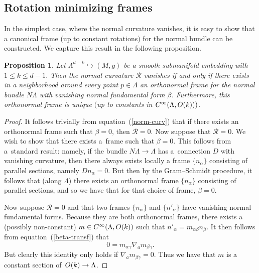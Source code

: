 \documentclass[10pt,a4paper]{article}
\numberwithin{equation}{section}
\newtheorem{Proposition}[Theorem]{Proposition}
 { \theoremstyle{definition}
\newtheorem{Definition}[Theorem]{Definition}
\newtheorem{Note}[Theorem]{Note}
\newtheorem{Problem}[Theorem]{Problem}
\newtheorem{Example}[Theorem]{Example}
\newtheorem{Remark}[Theorem]{Remark} }
\renewcommand{\=}{\stackrel \Lambda =}
\begin{document}
\subsection{Rotation minimizing frames}

In the simplest case, where the normal curvature vanishes, it is easy to show that a canonical frame (up to constant rotations) for the normal bundle can be constructed. We capture this result in the following proposition.
\begin{Proposition} \label{riem-canonical-frame}
Let $\Lambda^{d-k} \hookrightarrow (M,g)$ be a smooth submanifold embedding with $1 \leq k \leq d-1$. Then the normal curvature $\mathcal{R}$ vanishes if and only if there exists in a neighborhood around every point $p \in \Lambda$ an orthonormal frame for the normal bundle $N \Lambda$ with vanishing normal fundamental form $\beta$. Furthermore, this orthonormal frame is unique $($up to constants in $C^\infty(\Lambda,{\rm O}(k)))$.
\end{Proposition}
\begin{proof}
It follows trivially from equation~(\ref{norm-curv}) that if there exists an orthonormal frame such that $\beta = 0$, then $\mathcal{R} = 0$. Now suppose that $\mathcal{R} = 0$. We wish to show that there exists a~frame such that $\beta = 0$. This follows from a~standard result: namely, if the bundle $N \Lambda \rightarrow \Lambda$ has a~connection $D$ with vanishing curvature, then there always exists locally a frame $\{n_{\alpha}\}$ consisting of parallel sections, namely $D n_{\alpha} = 0$. But then by the Gram--Schmidt procedure, it follows that (along $\Lambda$) there exists an orthonormal frame $\{n_{\alpha}\}$ consisting of parallel sections, and so we have that for that choice of frame, $\beta = 0$.

Now suppose $\mathcal{R} = 0$ and that two frames $\{n_{\alpha}\}$ and $\{n'_{\alpha}\}$ have vanishing normal fundamental forms. Because they are both orthonormal frames, there exists a (possibly non-constant) $m \in C^\infty(\Lambda, {\rm O}(k))$ such that $n'_{\alpha} = m_{\alpha \beta} n_{\beta}$. It then follows from equation~(\ref{beta-transf}) that
\[
0 = m_{\alpha \gamma} \nabla_a m_{\beta \gamma} .
\]
But clearly this identity only holds if $\nabla_a m_{\beta \gamma} = 0$. Thus we have that $m$ is a constant section of~${{\rm O}(k) \rightarrow \Lambda}$.
\end{proof}
\end{document}
